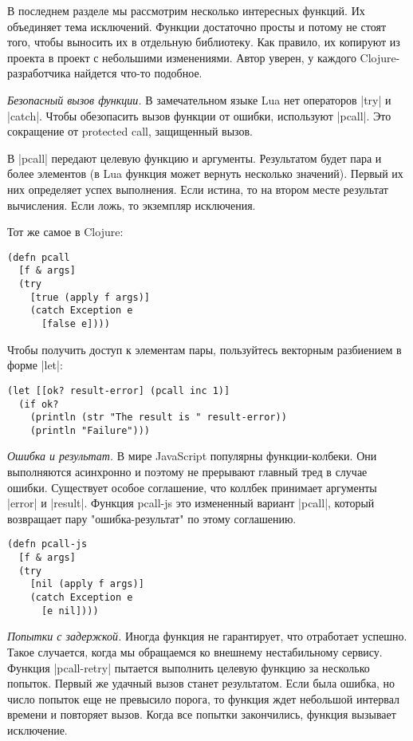 В последнем разделе мы рассмотрим несколько интересных функций. Их объединяет
тема исключений. Функции достаточно просты и потому не стоят того, чтобы
выносить их в отдельную библиотеку. Как правило, их копируют из проекта в проект
с небольшими изменениями. Автор уверен, у каждого Clojure-разработчика найдется
что-то подобное.

\emph{Безопасный вызов функции.} В замечательном языке Lua нет операторов \spverb|try| и
\spverb|catch|. Чтобы обезопасить вызов функции от ошибки, используют \spverb|pcall|. Это
сокращение от protected call, защищенный вызов.

В \spverb|pcall| передают целевую функцию и аргументы. Результатом будет пара и более
элементов (в Lua функция может вернуть несколько значений). Первый их них
определяет успех выполнения. Если истина, то на втором месте результат
вычисления. Если ложь, то экземпляр исключения.

Тот же самое в Clojure:

\begin{verbatim}
(defn pcall
  [f & args]
  (try
    [true (apply f args)]
    (catch Exception e
      [false e])))
\end{verbatim}

Чтобы получить доступ к элементам пары, пользуйтесь векторным разбиением в форме
\spverb|let|:

\begin{verbatim}
(let [[ok? result-error] (pcall inc 1)]
  (if ok?
    (println (str "The result is " result-error))
    (println "Failure")))
\end{verbatim}

\emph{Ошибка и результат.} В мире JavaScript популярны функции-колбеки. Они
выполняются асинхронно и поэтому не прерывают главный тред в случае
ошибки. Существует особое соглашение, что коллбек принимает аргументы \spverb|error| и
\spverb|result|. Функция pcall-js это измененный вариант \spverb|pcall|, который возвращает
пару "ошибка-результат" по этому соглашению.

\begin{verbatim}
(defn pcall-js
  [f & args]
  (try
    [nil (apply f args)]
    (catch Exception e
      [e nil])))
\end{verbatim}

\emph{Попытки с задержкой.} Иногда функция не гарантирует, что отработает
успешно. Такое случается, когда мы обращаемся ко внешнему нестабильному
сервису. Функция \spverb|pcall-retry| пытается выполнить целевую функцию за несколько
попыток. Первый же удачный вызов станет результатом. Если была ошибка, но число
попыток еще не превысило порога, то функция ждет небольшой интервал времени и
повторяет вызов. Когда все попытки закончились, функция вызывает исключение.

